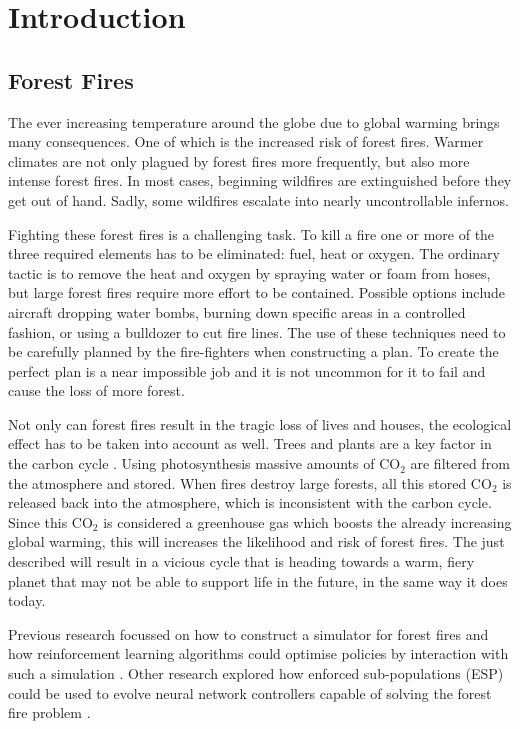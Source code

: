 \section{Introduction}\label{sec:introduction}

\subsection{Forest Fires}
The ever increasing temperature around the globe due to global warming brings many consequences. One of which is the increased risk of forest fires. Warmer climates are not only plagued by forest fires more frequently, but also more intense forest fires.  In most cases, beginning wildfires are extinguished before they get out of hand. Sadly, some wildfires escalate into nearly uncontrollable infernos.

Fighting these forest fires is a challenging task. To kill a fire one or more of the three required elements has to be eliminated: fuel, heat or oxygen. The ordinary tactic is to remove the heat and oxygen by spraying water or foam from hoses, but large forest fires require more effort to be contained. Possible options include aircraft dropping water bombs, burning down specific areas in a controlled fashion, or using a bulldozer to cut fire lines. The use of these techniques need to be carefully planned by the fire-fighters when constructing a plan. To create the perfect plan is a near impossible job and it is not uncommon for it to fail and cause the loss of more forest.

Not only can forest fires result in the tragic loss of lives and houses, the ecological effect has to be taken into account as well. Trees and plants are a key factor in the carbon cycle \citep{kasischke1995fire}. Using photosynthesis massive amounts of CO$_{2}$ are filtered from the atmosphere and stored. When fires destroy large forests, all this stored CO$_{2}$ is released back into the atmosphere, which is inconsistent with the carbon cycle. Since this CO$_{2}$ is considered a greenhouse gas \citep{houghton1991climate} which boosts the already increasing global warming, this will increases the likelihood and risk of forest fires. The just described will result in a vicious cycle that is heading towards a warm, fiery planet that may not be able to support life in the future, in the same way it does today. 

Previous research focussed on how to construct a simulator for forest fires and how reinforcement learning algorithms could optimise policies by interaction with such a simulation \citep{wiering1998learning}. Other research explored how enforced sub-populations (ESP) could be used to evolve neural network controllers capable of solving the forest fire problem \citep{wiering2005evolving}.


